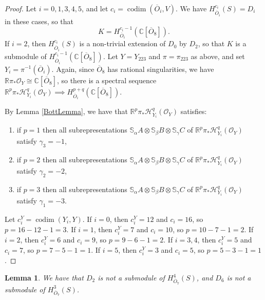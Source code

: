 \documentclass[11pt,reqno]{amsart}
\newcommand{\oo}{\otimes}
\newcommand{\bS}{\mathbb{S}}
\newcommand{\C}{\mathbb{C}}
\newcommand{\codim}{\operatorname{codim}}
\newcommand{\mc}[1]{\mathcal{#1}}
\newcommand{\ol}[1]{\overline{#1}}
\newtheorem{lemma}[theorem]{Lemma}
\numberwithin{equation}{section}
\begin{document}
\begin{proof}
Let $i=0,1,3,4,5$, and let $c_i=\codim(\ol{O}_i,V)$. We have $H^{c_i}_{\ol{O}_i}(S)=D_i$ in these cases, so that
$$
K=H^{c_i-1}_{\ol{O}_i}(\C[\ol{O}_8]).
$$
If $i=2$, then $H^{c_i}_{\ol{O}_i}(S)$ is a non-trivial extension of $D_0$ by $D_2$, so that $K$ is a submodule of $H^{c_i-1}_{\ol{O}_i}(\C[\ol{O}_8])$.
Let $Y=Y_{223}$ and $\pi=\pi_{223}$ as above, and set $Y_i=\pi^{-1}(\ol{O}_i)$. Again, since $\ol{O}_8$ has rational singularities, we have $\mathbb{R}\pi_{\ast}\mc{O}_Y\cong \C[\ol{O}_8]$, so there is a spectral sequence $\mathbb{R}^p\pi_{\ast}\mathscr{H}^q_{Y_i}(\mc{O}_Y)\implies H^{p+q}_{\ol{O}_i}(\C[\ol{O}_8])$.

By Lemma \ref{BottLemma}, we have that $\mathbb{R}^p\pi_{\ast}\mathscr{H}^q_{Y_i}(\mc{O}_Y)$ satisfies:
\begin{enumerate}
\item if $p=1$ then all subrepresentations $\bS_{\alpha}A\oo \bS_{\beta}B\oo \bS_{\gamma}C$ of  $\mathbb{R}^p\pi_{\ast}\mathscr{H}^q_{Y_i}(\mc{O}_Y)$	satisfy $\gamma_3=-1$,
\item if $p=2$ then all subrepresentations $\bS_{\alpha}A\oo \bS_{\beta}B\oo \bS_{\gamma}C$ of  $\mathbb{R}^p\pi_{\ast}\mathscr{H}^q_{Y_i}(\mc{O}_Y)$	satisfy $\gamma_2=-2$,
\item if $p=3$ then all subrepresentations $\bS_{\alpha}A\oo \bS_{\beta}B\oo \bS_{\gamma}C$ of  $\mathbb{R}^p\pi_{\ast}\mathscr{H}^q_{Y_i}(\mc{O}_Y)$	satisfy $\gamma_1=-3$.
\end{enumerate}
Let $c_i^Y=\codim(Y_i,Y)$. If $i=0$, then $c_i^Y=12$ and $c_i=16$, so $p=16-12-1=3$. If $i=1$, then $c_i^Y=7$ and $c_i=10$, so $p=10-7-1=2$. If $i=2$, then $c_i^Y=6$ and $c_i=9$, so $p=9-6-1=2$. If $i=3,4$, then $c_i^Y=5$ and $c_i=7$, so $p=7-5-1=1$. If $i=5$, then $c_i^Y=3$ and $c_i=5$, so $p=5-3-1=1$.
\end{proof}

\begin{lemma}\label{lem:2notsub7}
We have that $D_2$ is not a submodule of $H^4_{\ol{O}_7}(S)$, and $D_6$ is not a submodule of $H^3_{\ol{O}_7}(S)$.	
\end{lemma}
\end{document}

